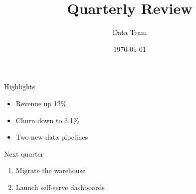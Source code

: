 \documentclass{beamer}
\title{Quarterly Review}
\author{Data Team}
\date{\today}
\begin{document}
\frame{\titlepage}

\begin{frame}{Highlights}
  \begin{itemize}
    \item Revenue up 12\%
    \item Churn down to 3.1\%
    \item Two new data pipelines
  \end{itemize}
\end{frame}

\begin{frame}{Next quarter}
  \begin{enumerate}
    \item Migrate the warehouse
    \item Launch self-serve dashboards
  \end{enumerate}
\end{frame}
\end{document}
